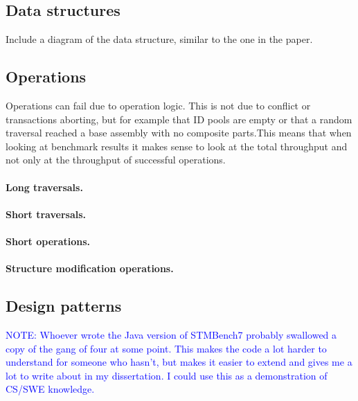 \documentclass[12pt,a4paper,oneside,openright]{report}
\newcommand{\note}[1]{\textcolor{blue}{NOTE: #1}}
\begin{document}
\subsection{Data structures}
\label{sec:impl:data-structures}

Include a diagram of the data structure, similar to the one in the
paper.

\subsection{Operations}
\label{sec:impl:operations}

Operations can fail due to operation logic. This is not due to
conflict or transactions aborting, but for example that ID pools are
empty or that a random traversal reached a base assembly with no
composite parts.This means that when looking at benchmark results it
makes sense to look at the total throughput and not only at the
throughput of successful operations.

\paragraph{Long traversals.}
\label{sec:impl:long-traversals}

\paragraph{Short traversals.}
\label{sec:impl:short-traversals}

\paragraph{Short operations.}
\label{sec:impl:short-operations}

\paragraph{Structure modification operations.}
\label{sec:impl:struct-modif-oper}

\subsection{Design patterns}
\label{sec:impl:design-patterns}

\note{Whoever wrote the Java version of STMBench7 probably swallowed a
  copy of the gang of four at some point. This makes the code a lot
  harder to understand for someone who hasn't, but makes it easier to
  extend and gives me a lot to write about in my dissertation. I could
  use this as a demonstration of CS/SWE knowledge.}
\end{document}
